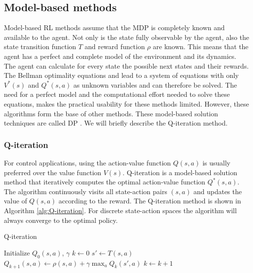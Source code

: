 \subsection{Model-based methods}\label{sec:RL-Model_based_methods}
Model-based RL methods assume that the \ac{MDP} is completely known and available to the agent. Not only is the state fully observable by the agent, also the state transition function $T$ and reward function $\rho$ are known. This means that the agent has a perfect and complete model of the environment and its dynamics. The agent can calculate for every state the possible next states and their rewards. The Bellman optimality equations  and  lead to a system of equations with only $V^*(s)$ and $Q^*(s,a)$ as unknown variables and can therefore be solved. The need for a perfect model and the computational effort needed to solve these equations, makes the practical usability for these methods limited. However, these algorithms form the base of other methods. These model-based solution techniques are called \ac{DP} \cite{Bellman:57}. We will briefly describe the Q-iteration method.
			
\subsubsection{Q-iteration}\label{sec:RL-Q_iteration}

For control applications, using the action-value function $Q(s,a)$ is usually preferred over the value function $V(s)$. Q-iteration is a model-based solution method that iteratively computes the optimal action-value function $Q^*(s,a)$. The algorithm continuously visits all state-action pairs $(s,a)$ and updates the value of $Q(s,a)$ according to the reward. The Q-iteration method is shown in Algorithm \ref{alg:Q-iteration}. For discrete state-action spaces the algorithm will always converge to the optimal policy. 

\begin{algorithm}[ht]
	\caption{Q-iteration} \label{alg:Q-iteration}
	\begin{algorithmic}[1]
		\State Initialize $Q_0(s,a)$, $\gamma$
		\State $k \gets 0$
		\Repeat
					\State $s' \gets T(s,a)$
					\State $Q_{k+1}(s,a) \gets \rho(s,a) + \gamma \max_a{Q_k(s',a)} $ 
				\EndFor
			\EndFor
			\State $k \gets k+1$
	\end{algorithmic}
\end{algorithm}

